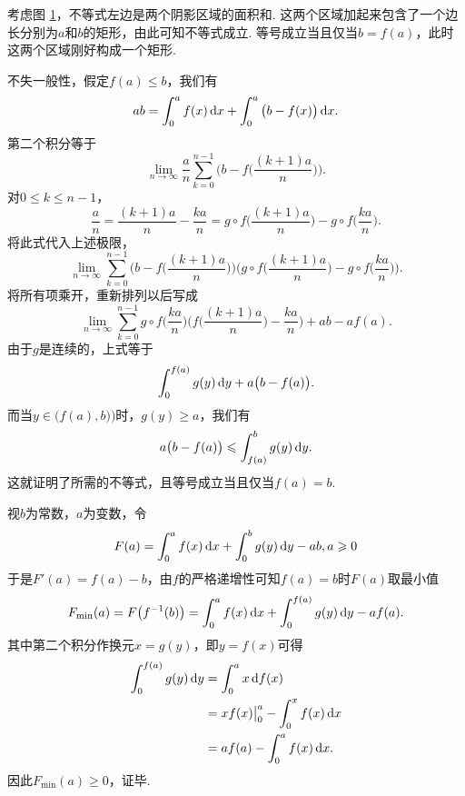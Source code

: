 \begin{ans}
  \method 考虑图 \ref{fig1.5.18}，不等式左边是两个阴影区域的面积和. 这两个区域加起来包含了一个边长分别为$a$和$b$的矩形，由此可知不等式成立. 等号成立当且仅当$b=f(a)$，此时这两个区域刚好构成一个矩形.
  \begin{figure}[ht]
    \centering
  \caption{\label{fig1.5.18}}
  \end{figure}

  \method 不失一般性，假定$f(a)\le b$，我们有
  \[
    ab=\int_0^af(x)\,\mathrm dx +\int_0^a\big(b-f(x)\big)\,\mathrm dx.
  \]
  第二个积分等于
  \[
    \lim_{n\to\infty}\frac an\sum_{k=0}^{n-1}\bigg(
      b - f\Big( \frac{(k+1)a}n \Big)
    \bigg).
  \]
  对$0\le k\le n-1$，
  \[
    \frac an=\frac{(k+1)a}n - \frac{ka}n =
    g\circ f\Big( \frac{(k+1)a}n \Big) -
    g\circ f\Big( \frac{ka}n \Big).
  \]
  将此式代入上述极限，
  \[
    \lim_{n\to\infty}\sum_{k=0}^{n-1}
    \bigg( b-f\Big( \frac{(k+1)a}n \Big) \bigg)
    \bigg( g\circ f\Big( \frac{(k+1)a}n \Big)
    -g\circ f\Big( \frac{ka}n \Big) \bigg).
  \]
  将所有项乘开，重新排列以后写成
  \[
    \lim_{n\to\infty}\sum_{k=0}^{n-1}g\circ f\Big(\frac{ka}n\Big)
    \bigg( f\Big( \frac{(k+1)a}n \Big)
    - \frac{ka}n \bigg) + ab-af(a).
  \]
  由于$g$是连续的，上式等于
  \[ \int_0^{f(a)}g(y)\,\mathrm dy+a\big(b-f(a)\big). \]
  而当$y\in\big(f(a),b)\big)$时，$g(y)\ge a$，我们有
  \[ a\big(b - f(a)\big) \leqslant \int_{f(a)}^bg(y)\,\mathrm dy. \]
  这就证明了所需的不等式，且等号成立当且仅当$f(a)=b$.

  \method 视$b$为常数，$a$为变数，令
  \[ F(a)=\int_0^af(x)\,\mathrm dx + \int_0^bg(y)\,\mathrm dy - ab,a\geqslant0 \]
  于是$F'(a)=f(a)-b$，由$f$的严格递增性可知$f(a)=b$时$F(a)$取最小值
  \[
    F_{\min}(a)=F\big(f^{-1}(b)\big)
    = \int_0^af(x)\,\mathrm dx + \int_0^{f(a)}g(y)\,\mathrm dy - af(a).
  \]
  其中第二个积分作换元$x=g(y)$，即$y=f(x)$可得
  \begin{align*}
    \int_0^{f(a)}g(y)\,\mathrm dy & =
    \int_0^{a}x\,\mathrm d f(x) \\
    & = xf(x)
    \big|_0^a -\int_0^x f(x)\,\mathrm dx \\
    & = af(a)-\int_0^a f(x)\,\mathrm dx.
  \end{align*}
  因此$F_{\min}(a)\ge0$，证毕.
\end{ans}

